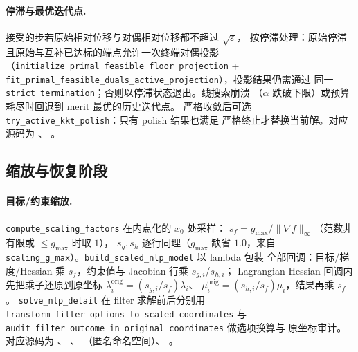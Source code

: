 \paragraph{停滞与最优迭代点.}
接受的步若原始相对位移与对偶相对位移都不超过 $\sqrt{\varepsilon}$，
按停滞处理：原始停滞且原始与互补已达标的端点允许一次终端对偶投影
（\texttt{initialize\_primal\_feasible\_floor\_projection} +
\texttt{fit\_primal\_feasible\_duals\_active\_projection}），投影结果仍需通过
同一 \texttt{strict\_termination}；否则以停滞状态退出。线搜索崩溃
（$\alpha$ 跌破下限）或预算耗尽时回退到 merit 最优的历史迭代点。
严格收敛后可选 \texttt{try\_active\_kkt\_polish}：只有 polish 结果也满足
严格终止才替换当前解。对应源码为
、
。

\subsection{缩放与恢复阶段}
\label{subsec:engine-ipm-scaling-restoration}

\paragraph{目标/约束缩放.}
\texttt{compute\_scaling\_factors} 在内点化的 $x_0$ 处采样：
$s_f = g_{\max}/\|\nabla f\|_{\infty}$（范数非有限或 $\le g_{\max}$ 时取 $1$），
$s_g, s_h$ 逐行同理（$g_{\max}$ 缺省 $1.0$，来自
\texttt{scaling\_g\_max}）。\texttt{build\_scaled\_nlp\_model} 以 lambda 包装
全部回调：目标/梯度/Hessian 乘 $s_f$，约束值与 Jacobian 行乘 $s_{g,i}$/$s_{h,i}$；
Lagrangian Hessian 回调内先把乘子还原到原坐标
$\lambda^{\text{orig}}_i = (s_{g,i}/s_f)\lambda_i$、
$\mu^{\text{orig}}_i = (s_{h,i}/s_f)\mu_i$，结果再乘 $s_f$。
\texttt{solve\_nlp\_detail} 在 filter 求解前后分别用
\texttt{transform\_filter\_options\_to\_scaled\_coordinates} 与
\texttt{audit\_filter\_outcome\_in\_original\_coordinates} 做选项换算与
原坐标审计。对应源码为
、
、
（匿名命名空间）、
。

